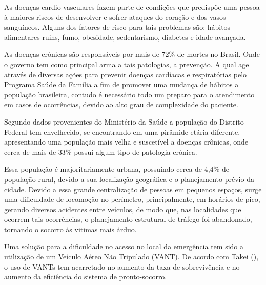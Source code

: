 As doenças cardio vasculares fazem parte de condições que predispõe uma pessoa à maiores riscos de 
desenvolver e sofrer ataques do coração e dos vasos sanguíneos. Alguns dos fatores de risco para tais problemas são: 
hábitos alimentares ruins, fumo, obesidade, sedentarismo, diabetes e idade avançada. \cite{ceolin}

As doenças crônicas são responsáveis por mais de 72\% de mortes no Brasil. Onde o governo tem como principal arma a tais patologias, 
a prevenção. A qual age através de diversas ações para prevenir doenças cardíacas e respiratórias pelo Programa Saúde da Família a fim de promover
uma mudança de hábitos a população brasileira, contudo é necessário todo um preparo para o atendimento em casos de ocorrências, devido ao alto grau de 
complexidade do paciente. ~\cite{portal}

Segundo dados provenientes do Ministério da Saúde a população do Distrito Federal tem envelhecido, se encontrando em uma pirâmide etária diferente, 
apresentando uma população mais velha e suscetível a doenças crônicas, onde cerca de mais de 33\% possui algum tipo de patologia crônica. \cite{portal}

Essa população é majoritariamente urbana, possuindo cerca de 4,4\% de população rural, devido a sua localização geográfica e o planejamento prévio da cidade. 
Devido a essa grande centralização de pessoas em pequenos espaços, surge uma dificuldade de locomoção no perímetro, principalmente, em horários de pico, 
gerando diversos acidentes entre veículos, de modo que, nas localidades que ocorrem tais ocorrências, o planejamento estrutural de tráfego foi abandonado, 
tornando o socorro às vitimas mais árduo. \cite{oliveira}

Uma solução para a dificuldade no acesso no local da emergência tem sido a utilização de um Veículo Aéreo Não Tripulado (VANT). 
De acordo com Takei (\citeyear{DEE}), o uso de VANTs tem acarretado no aumento da taxa de sobrevivência e no aumento da eficiência do sistema de pronto-socorro.